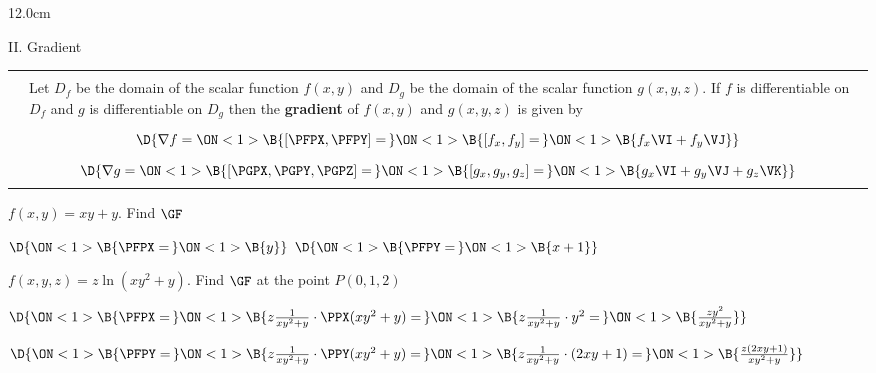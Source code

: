 \begin{frame}
\begin{columns}\begin{column}{12.0cm}

{II. Gradient}
\scriptsize
\begin{center}
{\setlength{\extrarowheight}{-0.2cm}
\begin{tabular}{|p{0.4cm}p{10.6cm}|}
	\hline
	\hline
	&\\
	\DEF & Let $D_f$ be the domain of the scalar function $f(x,y)$ and $D_g$ be the domain of the scalar function $g(x,y,z)$.  If $f$ is differentiable on $D_f$ and $g$ is differentiable on $D_g$ then the {\bf gradient} of $f(x,y)$ and $g(x,y,z)$ is given by \\
	&\\
	\multicolumn{2}{|c|}{$\D{\nabla f = 
	\ON<1>{\B{\left[\PFPX,\PFPY\right] =\,}} 
	\ON<1>{\B{\left[f_x,f_y\right] =\,}} 
	\ON<1>{\B{f_x \VI + f_y \VJ}}}$} \\
	& \\
	\multicolumn{2}{|c|}{$\D{\nabla g = 
	\ON<1>{\B{\left[\PGPX,\PGPY,\PGPZ\right] =\,}} 
	\ON<1>{\B{\left[g_x,g_y,g_z\right] =\,}} 
	\ON<1>{\B{g_x \VI + g_y \VJ + g_z \VK}}}$} \\
	& \\
	\hline
	\hline
\end{tabular}}
\end{center}
\EX $f(x,y) = xy + y$. \quad Find $\GF$

\vspace{0.2cm}

$\D{\ON<1>{\B{\PFPX =\,}} 
\ON<1>{\B{y}}}$ \quad 
{} \quad $\D{
\ON<1>{\B{\PFPY =\,}} 
\ON<1>{\B{x + 1}}}$ \quad 
{} \quad 
{}

\vspace{0.2cm}

\EX $f(x,y,z) = z\ln(xy^2 + y)$. \quad Find $\GF$ at the point $P(0,1,2)$

\vspace{0.1cm}

$\D{\ON<1>{\B{\PFPX =\,}} 
\ON<1>{\B{z\frac{1}{xy^2 + y}\cdot \PPX(xy^2 + y) = \,}} 
\ON<1>{\B{z\frac{1}{xy^2 + y}\cdot y^2 =\,}} 
\ON<1>{\B{\frac{zy^2}{xy^2 + y}}}}$

\vspace{0.1cm}

$\D{\ON<1>{\B{\PFPY = \,}}
\ON<1>{\B{z\frac{1}{xy^2 + y}\cdot \PPY(xy^2 + y) = \,}}
\ON<1>{\B{z\frac{1}{xy^2 + y}\cdot (2xy+1) =\,}}
\ON<1>{\B{\frac{z(2xy+1)}{xy^2 + y}}}}$


\end{column}
\end{columns}
\end{frame}
